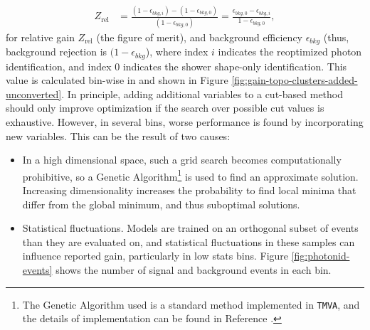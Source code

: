 \begin{align}
    Z_{\text{rel}} &= \frac{(1-\epsilon_{bkg,i}) - (1-\epsilon_{bkg,0})}{(1-\epsilon_{bkg,0})} = \frac{\epsilon_{bkg,0} - \epsilon_{bkg,i}}{1-\epsilon_{bkg,0}},
    \label{eqn:improvement-metric}
\end{align}
for relative gain $Z_{\text{rel}}$ (the figure of merit), and background efficiency $\epsilon_{bkg}$ (thus, background rejection is $(1-\epsilon_{bkg}$), where index $i$ indicates the reoptimized photon identification, and index $0$ indicates the shower shape-only identification. This value is calculated bin-wise in \etaPt and shown in Figure \ref{fig:gain-topo-clusters-added-unconverted}. In principle, adding additional variables to a cut-based method should only improve optimization if the search over possible cut values is exhaustive. However, in several bins, worse performance is found by incorporating new variables. This can be the result of two causes:
\begin{itemize}
    \item In a high dimensional space, such a grid search becomes computationally prohibitive, so a Genetic Algorithm\footnote{The Genetic Algorithm used is a standard method implemented in \texttt{TMVA}, and the details of implementation can be found in Reference \cite{TMVA}.} \cite{genetic-algo} is used to find an approximate solution. Increasing dimensionality increases the probability to find local minima that differ from the global minimum, and thus suboptimal solutions.
    \item Statistical fluctuations. Models are trained on an orthogonal subset of events than they are evaluated on, and statistical fluctuations in these samples can influence reported gain, particularly in low stats bins. Figure \ref{fig:photonid-events} shows the number of signal and background events in each \etaPt bin.
\end{itemize}
